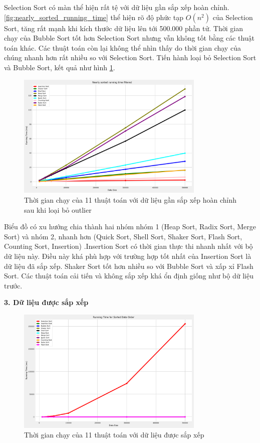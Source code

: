 Selection Sort có màn thể hiện rất tệ với dữ liệu gần sắp xếp hoàn chỉnh. \ref{fig:nearly_sorted_running_time} thể hiện rõ độ phức tạp $O(n^2)$ của Selection Sort, tăng rất mạnh khi kích thước dữ liệu lên tới 500.000 phần tử. Thời gian chạy của Bubble Sort tốt hơn Selection Sort nhưng vẫn không tốt bằng các thuật toán khác. Các thuật toán còn lại không thể nhìn thấy do thời gian chạy của chúng nhanh hơn rất nhiều so với Selection Sort. Tiến hành loại bỏ Selection Sort và Bubble Sort, kết quả như hình \ref{fig:nearly_sorted_running_time_filtered}.


\begin{figure}[H]
    \centering
    \includegraphics[width=0.8\textwidth]{exprimental_result/images/nearly_sorted_running_time_filtered.png}
    \caption{Thời gian chạy của 11 thuật toán với dữ liệu gần sắp xếp hoàn chỉnh sau khi loại bỏ outlier}
    \label{fig:nearly_sorted_running_time_filtered}
\end{figure}

Biểu đồ có xu hướng chia thành hai nhóm nhóm 1 (Heap Sort, Radix Sort, Merge Sort) và nhóm 2, nhanh hơn (Quick Sort, Shell Sort, Shaker Sort, Flash Sort, Counting Sort, Insertion) .Insertion Sort có thời gian thực thi nhanh nhất với bộ dữ liệu này. Điều này khá phù hợp với trường hợp tốt nhất của Insertion Sort là dữ liệu đã sắp xếp. Shaker Sort tốt hơn nhiều so với Bubble Sort và xấp xỉ Flash Sort. Các thuật toán cải tiến và không sắp xếp khá ổn định giống như bộ dữ liệu trước.


\textbf{3. Dữ liệu được sắp xếp}

\begin{figure}[H]
    \centering
    \includegraphics[width=0.8\textwidth]{exprimental_result/images/sorted_running_time.png}
    \caption{Thời gian chạy của 11 thuật toán với dữ liệu được sắp xếp}
    \label{fig:sorted_running_time}
\end{figure}

